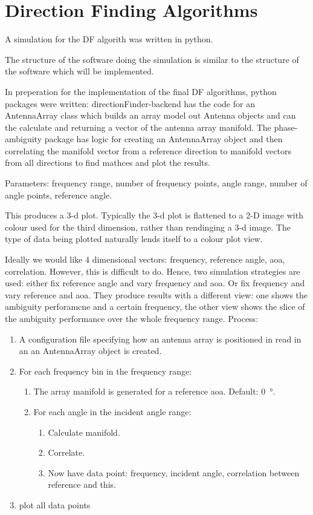 \chapter{Direction Finding Algorithms}
\label{ch:df-algorithms}
\graphicspath{{./img/df-algorithms/}}

A simulation for the DF algorith was written in python.

The structure of the software doing the simulation is similar to the structure of the software which will be implemented.

In preperation for the implementation of the final DF algorithms, python packages were written: 
directionFinder-backend has the code for an AntennaArray class which builds an array model out Antenna objects and can the calculate and returning a vector of the antenna array manifold. The phase-ambiguity package has logic for creating an AntennaArray object and then correlating the manifold vector from a reference direction to manifold vectors from all directions to find mathces and plot the results.

Parameters:
frequency range, number of frequency points, angle range, number of angle points, reference angle.

This produces a 3-d plot. Typically the 3-d plot is flattened to a 2-D image with colour used for the third dimension, rather than rendinging a 3-d image. The type of data being plotted naturally lends itself to a colour plot view.


Ideally we would like 4 dimensional vectors: frequency, reference angle, aoa, correlation. However, this is difficult to do. Hence, two simulation strategies are used: either fix reference angle and vary frequency and aoa. Or fix frequency and vary reference and aoa. They produce results with a different view: one shows the ambiguity perforamcne and a certain frequency, the other view shows the slice of the ambiguity performance over the whole frequency range. Process:

\begin{enumerate}
  \item A configuration file specifying how an antenna array is positioned in read in an an AntennaArray object is created.
  \item For each frequency bin in the frequency range:
  \begin{enumerate}
    \item The array manifold is generated for a reference \gls{aoa}. Default: \SI{0}{\degree}.
    \item For each angle in the incident angle range:
    \begin{enumerate}
      \item Calculate manifold.
      \item Correlate.
      \item Now have data point: frequency, incident angle, correlation between reference and this.
    \end{enumerate}
  \end{enumerate}
  \item plot all data points
\end{enumerate}

